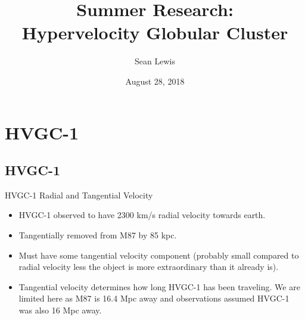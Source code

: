 \documentclass[aspectratio=169]{beamer}
\author[S.~Lewis]{Sean Lewis}
\date[2018-28-08]{August 28, 2018}
\title[Progress Report]{\Huge Summer Research: \\ Hypervelocity Globular Cluster}
\institute{Drexel University}
\begin{document}
\begin{frame}
  \maketitle
\end{frame}

\section{HVGC-1}
\subsection{HVGC-1}

\begin{frame}
  {HVGC-1 Radial and Tangential Velocity}
  \begin{itemize}
    \item HVGC-1 observed to have 2300 km/s radial velocity towards earth. 
    \item Tangentially removed from M87 by 85 kpc. 
    \item Must have some tangential velocity component (probably small compared to radial velocity less the object is more extraordinary than it already is).
    \item Tangential velocity determines how long HVGC-1 has been traveling. We are limited here as M87 is 16.4 Mpc away and observations assumed HVGC-1 was also 16 Mpc away.
  \end{itemize}
  
\end{frame}
\end{document}
